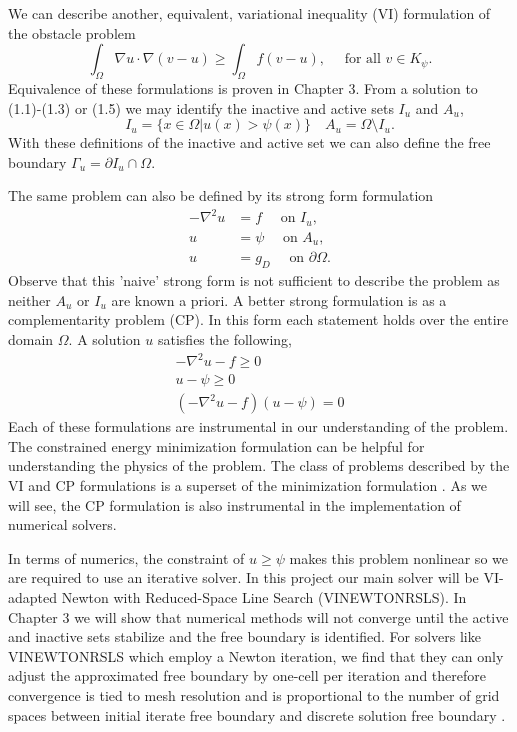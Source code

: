\documentclass[]{interact}
\theoremstyle{plain}%
\theoremstyle{definition}
\theoremstyle{remark}
\begin{document}
  We can describe another, equivalent, variational inequality (VI) formulation of the obstacle problem 
  \begin{equation}
    \int_\Omega \nabla u \cdot \nabla(v - u) \geq \int_\Omega f(v - u), \quad \text{ for all } v \in K_\psi.
  \end{equation} 
  Equivalence of these formulations is proven in Chapter 3. From a solution to (1.1)-(1.3) or (1.5) we may identify the inactive and active sets $I_u$ and $A_u$,
\begin{equation}
  I_u = \{x \in \Omega | u(x) > \psi(x)\} \quad A_u = \Omega \setminus I_u.
\end{equation} 
With these definitions of the inactive and active set we can also define the free boundary $\Gamma_u = \partial I_u \cap \Omega$.

The same problem can also be defined by its strong form formulation
\begin{align}
  -\nabla^2 u &= f \quad \text{ on } I_u,\\
  u &= \psi \quad \text{ on } A_u,\\
  u &= g_D \quad \text{ on } \partial \Omega.
\end{align}
 Observe that this 'naive' strong form is not sufficient to describe the problem as neither $A_u$ or $I_u$ are known a priori. A better strong formulation is as a complementarity problem (CP). In this form each statement holds over the entire domain $\Omega$. A solution $u$ satisfies the following, 
\begin{align}
  -\nabla^2 u - f \geq 0\\
  u - \psi \geq 0\\
  (-\nabla^2u - f)(u - \psi) = 0
\end{align}
Each of these formulations are instrumental in our understanding of the problem. The constrained energy minimization formulation can be helpful for understanding the physics of the problem. The class of problems described by the VI and CP formulations is a superset of the minimization formulation \citep[page 319]{Bueler2021}. As we will see, the CP formulation is also instrumental in the implementation of numerical solvers.

In terms of numerics, the constraint of $u \geq \psi$ makes this problem nonlinear so we are required to use an iterative solver. In this project our main solver will be VI-adapted Newton with Reduced-Space Line Search (VINEWTONRSLS). In Chapter 3 we will show that numerical methods will not converge until the active and inactive sets stabilize and the free boundary is identified. For solvers like VINEWTONRSLS which employ a Newton iteration, we find that they can only adjust the approximated free boundary by one-cell per iteration \citep{GraeserKornhuber2009} and therefore convergence is tied to mesh resolution and is proportional to the number of grid spaces between initial iterate free boundary and discrete solution free boundary \citep[page 324]{Bueler2021}. 
\end{document}
